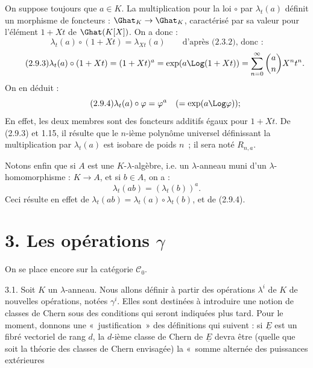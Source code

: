 
On
suppose toujours que \(a\in K\). La multiplication pour la loi \(\circ\) par \(\lambda_t(a)\) définit un morphisme de foncteurs : \(\Ghat_K\to\Ghat_K\), caractérisé par sa valeur pour l'élément \(1+Xt\) de \(\Ghat(K[X])\). On a donc :
\[
  \lambda_t(a)\circ(1+Xt)=\lambda_{Xt}(a)\qquad\text{d'après (2.3.2), donc :}
\]
\begin{equation}\tag{2.9.3}
  \lambda_t(a)\circ(1+Xt)
  =(1+Xt)^a
  =\exp(a\Log(1+Xt))
  =\sum_{n=0}^{\infty}\binom{a}{n}X^nt^n .
\end{equation}
On en déduit :
\begin{equation}\tag{2.9.4}
  \lambda_t(a)\circ\varphi=\varphi^a
  \quad(=\exp(a\Log\varphi)) ;
\end{equation}
En effet, les deux membres sont des foncteurs additifs égaux pour \(1+Xt\). De (2.9.3) et 1.15, il résulte que le \(n\)-ième polynôme universel définissant la multiplication par \(\lambda_t(a)\) est isobare de poids \(n\)~; il sera noté \(R_{n,a}\).

Notons enfin que si \(A\) est une \(K\)-\(\lambda\)-algèbre, i.e. un \(\lambda\)-anneau muni d'un \(\lambda\)-homomorphisme : \(K\to A\), et si \(b\in A\), on a :
\begin{equation}\tag{2.9.5}
  \lambda_t(ab)=(\lambda_t(b))^a .
\end{equation}
Ceci résulte en effet de \(\lambda_t(ab)=\lambda_t(a)\circ\lambda_t(b)\), et de (2.9.4).

\section*{3. Les opérations \(\gamma\)}

On se place encore sur la catégorie \(\mathcal C_0\).

3.1. Soit \(K\) un \(\lambda\)-anneau. Nous allons définir à partir des opérations \(\lambda^i\) de \(K\) de nouvelles opérations, notées \(\gamma^i\). Elles sont destinées à introduire une notion de classes de Chern sous des conditions qui seront indiquées plus tard. Pour le moment, donnons une «~justification~» des définitions qui suivent : si \(\underline{E}\) est un fibré vectoriel de rang \(d\), la \(d\)-ième classe de Chern de \(\underline{E}\) devra être (quelle que soit la théorie des classes de Chern envisagée) la «~somme alternée des puissances extérieures 
